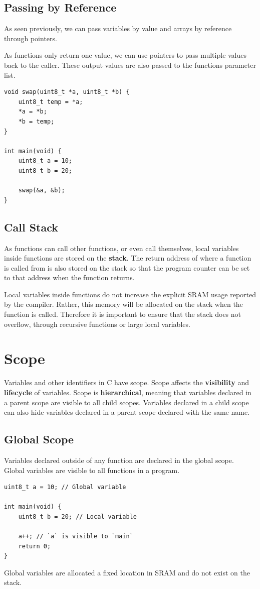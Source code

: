\documentclass[a4paper]{report}
\begin{document}
\subsection{Passing by Reference}
As seen previously, we can pass variables by value
and arrays by reference through pointers.

As functions only return one value, we can use pointers to pass
multiple values back to the caller. These output values are
also passed to the functions parameter list.
\begin{verbatim}
void swap(uint8_t *a, uint8_t *b) {
    uint8_t temp = *a;
    *a = *b;
    *b = temp;
}

int main(void) {
    uint8_t a = 10;
    uint8_t b = 20;

    swap(&a, &b);
}
\end{verbatim}
\subsection{Call Stack}
As functions can call other functions, or even call themselves,
local variables inside functions are stored on the \textbf{stack}.
The return address of where a function is called from is also stored
on the stack so that the program counter can be set to that address
when the function returns.

Local variables inside functions do not increase the explicit SRAM usage
reported by the compiler. Rather, this memory will be allocated
on the stack when the function is called. Therefore it is
important to ensure that the stack does not overflow, through
recursive functions or large local variables.
\section{Scope}
Variables and other identifiers in C have scope.
Scope affects the \textbf{visibility} and \textbf{lifecycle} of variables.
Scope is \textbf{hierarchical}, meaning that variables declared in a parent scope
are visible to all child scopes.
Variables declared in a child scope can also hide variables
declared in a parent scope declared with the same name.
\subsection{Global Scope}
Variables declared outside of any function are declared in the global scope.
Global variables are visible to all functions in a program.
\begin{verbatim}
uint8_t a = 10; // Global variable

int main(void) {
    uint8_t b = 20; // Local variable

    a++; // `a` is visible to `main`
    return 0;
}
\end{verbatim}
Global variables are allocated a fixed location in SRAM and
do not exist on the stack.
\end{document}
